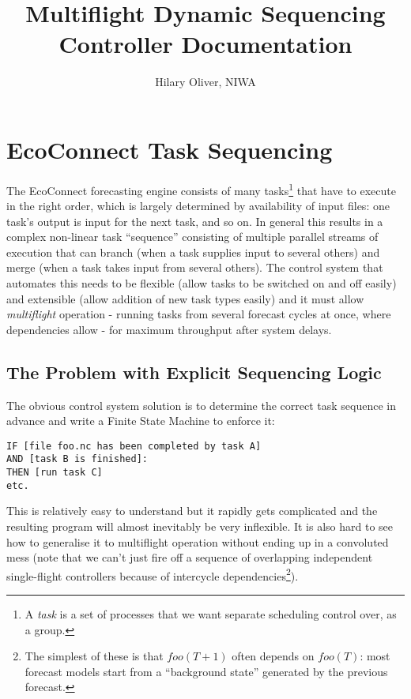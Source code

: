\documentclass[12pt]{article}
\title{Multiflight Dynamic Sequencing Controller Documentation}
\author{Hilary Oliver, NIWA}
\begin{document}
\maketitle

\section{EcoConnect Task Sequencing} 

The EcoConnect forecasting engine consists of many tasks\footnote{A {\em
task} is a set of processes that we want separate scheduling control
over, as a group.} that have to execute in the right order, which is
largely determined by availability of input files: one task's output is
input for the next task, and so on. In general this results in a complex
non-linear task ``sequence'' consisting of multiple parallel streams of
execution that can branch (when a task supplies input to several others)
and merge (when a task takes input from several others). The control
system that automates this needs to be flexible (allow tasks to be
switched on and off easily) and extensible (allow addition of new task
types easily) and it must allow {\em multiflight} operation - running
tasks from several forecast cycles at once, where dependencies allow -
for maximum throughput after system delays. 


\subsection{The Problem with Explicit Sequencing Logic}

The obvious control system solution is to determine the correct task
sequence in advance and write a Finite State Machine to enforce it:

\begin{verbatim}
IF [file foo.nc has been completed by task A] 
AND [task B is finished]:
THEN [run task C]
etc.
\end{verbatim} 

This is relatively easy to understand but it rapidly gets complicated
and the resulting program will almost inevitably be very inflexible. It
is also hard to see how to generalise it to multiflight operation
without ending up in a convoluted mess (note that we can't just fire off
a sequence of overlapping independent single-flight controllers because
of intercycle dependencies\footnote{The simplest of these is that
$foo(T+1)$ often depends on $foo(T)$: most forecast models start from a
``background state'' generated by the previous forecast.}). 
\end{document}
